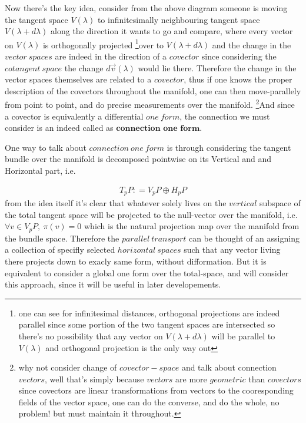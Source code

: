 \documentclass[8pt, twocoloumn]{article}
\begin{document}
Now there's the key idea, consider from the above diagram someone is moving the tangent space $V(\lambda)$ to infinitesimally neighbouring tangent space $V(\lambda + d\lambda )$ along the direction it wants to go and compare, where every vector on $V(\lambda)$ is orthogonally projected \footnote{one can see for infinitesimal distances, orthogonal projections are indeed parallel since some portion of the two tangent spaces are intersected so there's no possibility that any vector on $V(\lambda + d\lambda )$ will be parallel to $V(\lambda )$ and orthogonal projection is the only way out}over to $V(\lambda + d\lambda )$ and the change in the $vector \ spaces$ are indeed in the direction of a $covector$ since considering the $cotangent \ space$ the change $d \vec{v}(\lambda)$ would lie there. Therefore the change in the vector spaces themselves are related to a $covector$, thus if one knows the proper description of the covectors throughout the manifold, one can then move-parallely from point to point, and do precise measurements over the manifold. \footnote{
why not consider change of $covector-space$ and talk about connection $vectors$, well that's simply because $vectors$ are more $geometric$ than $covectors$ since covectors are linear transformations from vectors to the cooresponding fields of the vector space, one can do the converse, and do the whole, no problem! but must maintain it throughout.}And since a covector is equivalently a differential $one \ form$, the connection we must consider is an indeed called as $\textbf{connection one form}$. 

One way to talk about $connection \ one \ form$ is through considering the tangent bundle over the manifold is decomposed pointwise on its Vertical and and Horizontal part, i.e.

\begin{align}
T_pP: = V_pP \oplus H_pP
\end{align}
from the idea itself it's clear that whatever solely lives on the $vertical$ subspace of the total tangent space will be projected to the null-vector over the manifold, i.e. $\forall v \in V_pP, \ \pi(v)=0$ which is the natural projection map over the manifold from the bundle space. Therefore the $parallel \ transport$ can be thought of an assigning a collection of specifly selected $horizontal \ spaces$ such that any vector living there projects down to exacly same form, without difformation. But it is equivalent to consider a global one form over the total-space, and will consider this approach, since it will be useful in later developements. 
\end{document}
